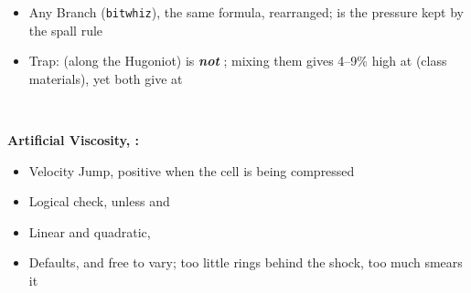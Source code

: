 \documentclass[11pt,addpoints]{exam}
\begin{document}
\begin{tcolorbox}[breakable]
\begin{itemize}
.~~~~~~~~~~ \hspace{7mm} \vspace{1em}
\item Any Branch (\texttt{bitwhiz}), \hspace{3mm}  \hspace{7mm} the same formula, rearranged;  is the pressure kept by the spall rule\vspace{.5em}
\item Trap: \hspace{3mm}  (along the Hugoniot) is \textbf{\emph{not}} ; mixing them gives  4--9\% high at  (class materials), yet both give  at 
\end{itemize}
\end{tcolorbox}

\;\\


\begin{tcolorbox}[breakable]
\textbf{Artificial Viscosity, :}\vspace{.5em}
\begin{itemize}
\item Velocity Jump, \hspace{3mm}  \hspace{7mm} positive when the cell is being compressed\vspace{.5em}
\item Logical check, \hspace{3mm}  \hspace{2mm} unless \hspace{2mm}  \hspace{2mm} and \hspace{2mm} \vspace{.5em}
\item Linear and quadratic, \hspace{3mm} \vspace{.5em}
\item Defaults, \hspace{3mm}  \hspace{2mm} and \hspace{2mm}  \hspace{7mm} free to vary; too little rings behind the shock, too much smears it
\end{itemize}
\end{tcolorbox}
\end{document}
